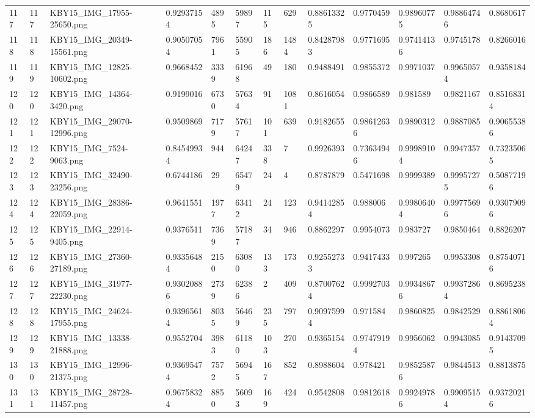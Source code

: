 \documentclass[11pt, a4paper, twoside]{report}
\begin{document}
\begin{longtable}[c]{@{}lllllllllllll@{}}
117 & 117 & KBY15\_IMG\_17955-25650.png & 0.92937154 & 4895 & 59897 & 115 & 629 & 0.88613325 & 0.9770459 & 0.98960775 & 0.98864746 & 0.8680617 \\
118 & 118 & KBY15\_IMG\_20349-15561.png & 0.90507054 & 7961 & 55905 & 186 & 1484 & 0.84287983 & 0.9771695 & 0.97414136 & 0.9745178 & 0.8266016 \\
119 & 119 & KBY15\_IMG\_12825-10602.png & 0.9668452 & 3339 & 61968 & 49 & 180 & 0.9488491 & 0.9855372 & 0.9971037 & 0.99650574 & 0.9358184 \\
120 & 120 & KBY15\_IMG\_14364-3420.png & 0.9199016 & 6730 & 57634 & 91 & 1081 & 0.8616054 & 0.9866589 & 0.981589 & 0.9821167 & 0.85168314 \\
121 & 121 & KBY15\_IMG\_29070-12996.png & 0.9509869 & 7179 & 57617 & 101 & 639 & 0.9182655 & 0.98612636 & 0.9890312 & 0.9887085 & 0.90655386 \\
122 & 122 & KBY15\_IMG\_7524-9063.png & 0.84549934 & 944 & 64247 & 338 & 7 & 0.9926393 & 0.73634946 & 0.99989104 & 0.9947357 & 0.73235065 \\
123 & 123 & KBY15\_IMG\_32490-23256.png & 0.6744186 & 29 & 65479 & 24 & 4 & 0.8787879 & 0.5471698 & 0.9999389 & 0.99957275 & 0.50877196 \\
124 & 124 & KBY15\_IMG\_28386-22059.png & 0.9641551 & 1977 & 63412 & 24 & 123 & 0.94142854 & 0.988006 & 0.99806404 & 0.99775696 & 0.93079096 \\
125 & 125 & KBY15\_IMG\_22914-9405.png & 0.9376511 & 7369 & 57187 & 34 & 946 & 0.8862297 & 0.9954073 & 0.983727 & 0.9850464 & 0.8826207 \\
126 & 126 & KBY15\_IMG\_27360-27189.png & 0.93356484 & 2150 & 63080 & 133 & 173 & 0.92552733 & 0.9417433 & 0.997265 & 0.9953308 & 0.87540716 \\
127 & 127 & KBY15\_IMG\_31977-22230.png & 0.93020886 & 2739 & 62386 & 2 & 409 & 0.87007624 & 0.9992703 & 0.99348676 & 0.99372864 & 0.8695238 \\
128 & 128 & KBY15\_IMG\_24624-17955.png & 0.93965614 & 8035 & 56469 & 235 & 797 & 0.90975994 & 0.971584 & 0.9860825 & 0.9842529 & 0.88618064 \\
129 & 129 & KBY15\_IMG\_13338-21888.png & 0.9552704 & 3983 & 61180 & 103 & 270 & 0.9365154 & 0.97479194 & 0.9956062 & 0.9943085 & 0.91437095 \\
130 & 130 & KBY15\_IMG\_12996-21375.png & 0.93695474 & 7572 & 56945 & 167 & 852 & 0.8988604 & 0.978421 & 0.98525876 & 0.9844513 & 0.8813875 \\
131 & 131 & KBY15\_IMG\_28728-11457.png & 0.96758324 & 8850 & 56093 & 169 & 424 & 0.9542808 & 0.9812618 & 0.99249786 & 0.99095154 & 0.93720216 \\

\end{longtable}
\end{document}
